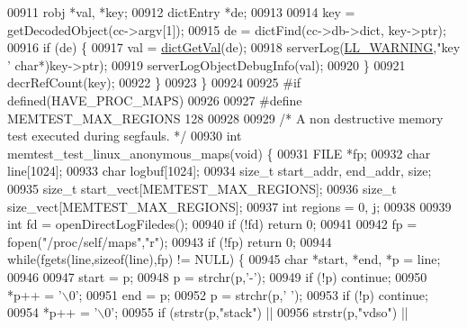 \begin{DoxyCode}
{{{{{{{{{{{{{{{{{{{{{{{{{{{{{{{{{{{{{{{{{{{{{{{{{{{{{{{{{{{{{{{{00911         robj *val, *key;
00912         dictEntry *de;
00913 
00914         key = getDecodedObject(cc->argv[1]);
00915         de = dictFind(cc->db->dict, key->ptr);
00916         \textcolor{keywordflow}{if} (de) \{
00917             val = \hyperlink{dict_8h_ae8d2cc391873b2bea2b87c4f80f43120}{dictGetVal}(de);
00918             serverLog(\hyperlink{server_8h_a31229b9334bba7d6be2a72970967a14b}{LL\_WARNING},\textcolor{stringliteral}{"key '%
      char}*)key->ptr);
00919             serverLogObjectDebugInfo(val);
00920         \}
00921         decrRefCount(key);
00922     \}
00923 \}
00924 
00925 \textcolor{preprocessor}{#}\textcolor{preprocessor}{if} \textcolor{preprocessor}{defined}\textcolor{preprocessor}{(}HAVE\_PROC\_MAPS\textcolor{preprocessor}{)}
00926 
00927 \textcolor{preprocessor}{#}\textcolor{preprocessor}{define} \textcolor{preprocessor}{MEMTEST\_MAX\_REGIONS} 128
00928 
00929 \textcolor{comment}{/* A non destructive memory test executed during segfauls. */}
00930 \textcolor{keywordtype}{int} memtest\_test\_linux\_anonymous\_maps(\textcolor{keywordtype}{void}) \{
00931     FILE *fp;
00932     \textcolor{keywordtype}{char} line[1024];
00933     \textcolor{keywordtype}{char} logbuf[1024];
00934     size\_t start\_addr, end\_addr, size;
00935     size\_t start\_vect[MEMTEST\_MAX\_REGIONS];
00936     size\_t size\_vect[MEMTEST\_MAX\_REGIONS];
00937     \textcolor{keywordtype}{int} regions = 0, j;
00938 
00939     \textcolor{keywordtype}{int} fd = openDirectLogFiledes();
00940     \textcolor{keywordflow}{if} (!fd) \textcolor{keywordflow}{return} 0;
00941 
00942     fp = fopen(\textcolor{stringliteral}{"/proc/self/maps"},\textcolor{stringliteral}{"r"});
00943     \textcolor{keywordflow}{if} (!fp) \textcolor{keywordflow}{return} 0;
00944     \textcolor{keywordflow}{while}(fgets(line,\textcolor{keyword}{sizeof}(line),fp) != NULL) \{
00945         \textcolor{keywordtype}{char} *start, *end, *p = line;
00946 
00947         start = p;
00948         p = strchr(p,\textcolor{stringliteral}{'-'});
00949         \textcolor{keywordflow}{if} (!p) \textcolor{keywordflow}{continue};
00950         *p++ = \textcolor{stringliteral}{'\(\backslash\)0'};
00951         end = p;
00952         p = strchr(p,\textcolor{stringliteral}{' '});
00953         \textcolor{keywordflow}{if} (!p) \textcolor{keywordflow}{continue};
00954         *p++ = \textcolor{stringliteral}{'\(\backslash\)0'};
00955         \textcolor{keywordflow}{if} (strstr(p,\textcolor{stringliteral}{"stack"}) ||
00956             strstr(p,\textcolor{stringliteral}{"vdso"}) ||
}}}}}}}}}}}}}}}}}}}}}}}}}}}}}}}}}}}}}}}}}}}}}}}}}}}}}}}}}}}}}}}}
\end{DoxyCode}
